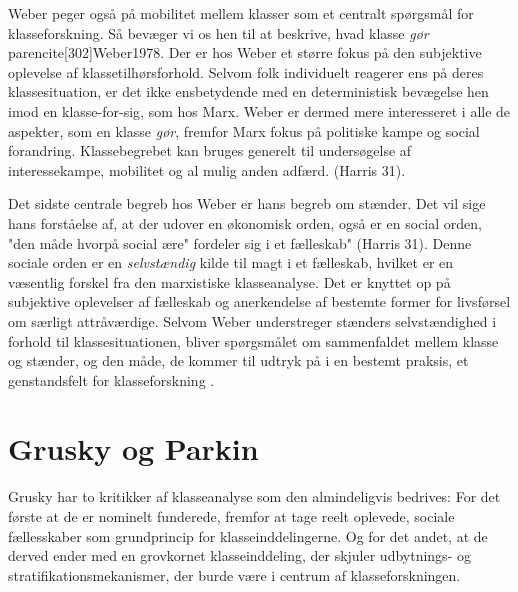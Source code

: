 Weber peger også på mobilitet mellem klasser som et centralt spørgsmål for klasseforskning. Så bevæger vi os hen til at beskrive, hvad klasse \emph{gør} parencite[302]{Weber1978}. Der er hos Weber et større fokus på den subjektive oplevelse af klassetilhørsforhold. Selvom folk individuelt reagerer ens på deres klassesituation, er det ikke ensbetydende med en deterministisk bevægelse hen imod en klasse-for-sig, som hos Marx. Weber er dermed mere interesseret i alle de aspekter, som en klasse \emph{gør}, fremfor Marx fokus på politiske kampe og social forandring. Klassebegrebet kan bruges generelt til undersøgelse af interessekampe, mobilitet og al mulig anden adfærd. (Harris 31). %

Det sidste centrale begreb hos Weber er hans begreb om stænder. Det vil sige hans forståelse af, at der udover en økonomisk orden, også er en social orden, "den måde hvorpå social ære" fordeler sig i et fælleskab" (Harris 31). Denne sociale orden er en \emph{selvstændig} kilde til magt i et fælleskab, hvilket er en væsentlig forskel fra den marxistiske klasseanalyse. Det er knyttet op på subjektive oplevelser af fælleskab og anerkendelse af bestemte former for livsførsel om særligt attråværdige. Selvom Weber understreger stænders selvstændighed i forhold til klassesituationen, bliver spørgsmålet om sammenfaldet mellem klasse og stænder, og den måde, de kommer til udtryk på i en bestemt praksis, et genstandsfelt for klasseforskning \parencite[32]{Harrits2014}.




\section{Grusky og Parkin \label{gruskyogparkin}}

Grusky har to kritikker af klasseanalyse som den almindeligvis bedrives: For det første at de er nominelt funderede, fremfor at tage reelt oplevede, sociale fællesskaber som grundprincip for klasseinddelingerne. Og for det andet, at de derved ender med en grovkornet klasseinddeling, der skjuler udbytnings- og stratifikationsmekanismer, der burde være i centrum af klasseforskningen. 


